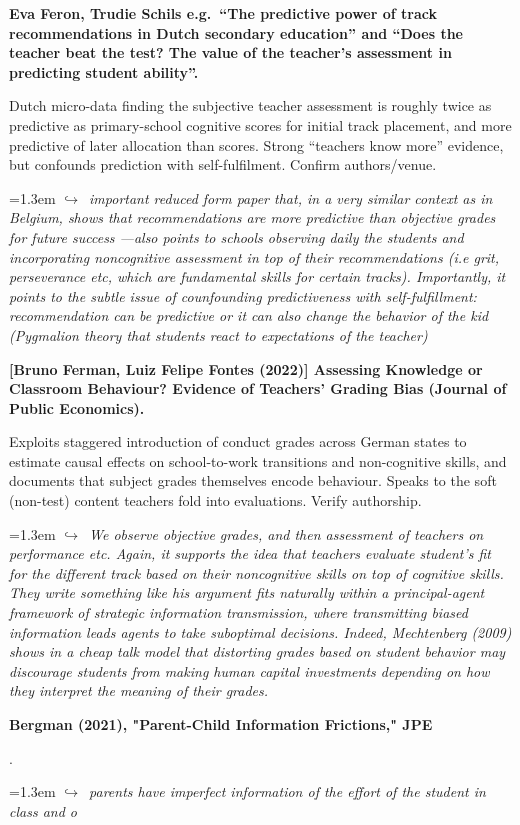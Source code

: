 \documentclass[11pt]{article}
\newcommand{\entry}[3]{%
  \par\medskip\noindent\textbf{#1}\par
  \nopagebreak #2\hspace{0.35em}{\small\color{tagcol}[#3]}\par}
\newcommand{\note}[1]{\par\smallskip\noindent\hangindent=1.3em
  \textcolor{notecol}{\footnotesize$\hookrightarrow$~\textit{#1}}}
\begin{document}
\entry{Eva Feron, Trudie Schils e.g.\ ``The predictive power of track
recommendations in Dutch secondary education'' and ``Does the teacher beat the test?
The value of the teacher's assessment in predicting student ability''.}
{Dutch micro-data finding the subjective teacher assessment is roughly twice as
predictive as primary-school cognitive scores for initial track placement, and more
predictive of later allocation than scores. Strong ``teachers know more'' evidence,
but confounds prediction with self-fulfilment. Confirm authors/venue.}{RF (verify)}
 \note{important reduced form paper that, in a very similar context as in Belgium, shows that recommendations are more predictive than objective grades for future success ---also points to schools observing daily the students and incorporating noncognitive assessment in top of their recommendations (i.e grit, perseverance etc, which are fundamental skills for certain tracks). Importantly, it points to the subtle issue of counfounding predictiveness with self-fulfillment: recommendation can be predictive or it can also change the behavior of the kid (Pygmalion theory that students react to expectations of the teacher)}

\entry{[Bruno Ferman, Luiz Felipe Fontes (2022)] Assessing Knowledge or Classroom
Behaviour? Evidence of Teachers' Grading Bias (Journal of Public Economics).}
{Exploits staggered introduction of conduct grades across German states to estimate
causal effects on school-to-work transitions and non-cognitive skills, and documents
that subject grades themselves encode behaviour. Speaks to the soft (non-test) content
teachers fold into evaluations. Verify authorship.}{RF (verify)}
\note{We observe objective grades, and then assessment of teachers on performance etc. Again, it supports the idea that teachers evaluate student's fit for the different track based on their noncognitive skills on top of cognitive skills. They write something like his argument fits naturally within a principal-agent framework of strategic information transmission, where transmitting biased information leads agents to take suboptimal decisions. Indeed, Mechtenberg (2009) shows in a cheap talk model that distorting grades based on student behavior may discourage students from making human capital investments depending on how they interpret the meaning of their grades. }

\entry{Bergman (2021), "Parent-Child Information Frictions," JPE}
{.}{RF }
\note{parents have imperfect information of the effort of the student in class and o }
\end{document}
